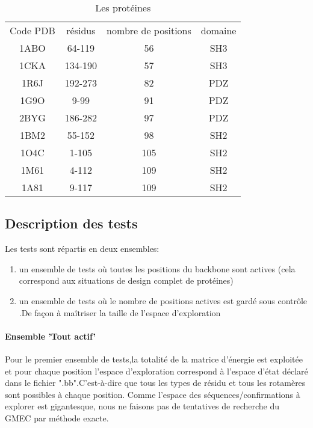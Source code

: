     \begin{table}[!htbp]
      \centering

      \begin{tabular}{cccc}

        \toprule
        Code PDB & résidus & nombre de positions & domaine\\
        \cmidrule{1-4}
        1ABO & 	64-119	 & 	56	 & SH3 \\
        1CKA & 	134-190	 & 	57	 & SH3 \\
        1R6J & 	192-273	 & 	82	 & PDZ \\
        1G9O & 	9-99	 & 	91	 & PDZ \\
        2BYG & 	186-282	 & 	97	 & PDZ \\
        1BM2 & 	55-152	 & 	98	 & SH2 \\
        1O4C & 	1-105	 & 	105	 & SH2 \\
        1M61 & 	4-112	 & 	109	 & SH2 \\
        1A81 & 	9-117	 & 	109	 & SH2 \\
        \bottomrule

      \end{tabular}      
      \caption{Les protéines}
\label{tab:protéines}      
    \end{table}

\subsection{Description des tests}
\label{sec:description_tests}
Les tests sont répartis en deux ensembles:
\begin{enumerate}
\item un ensemble de tests où toutes les positions du backbone sont actives (cela correspond aux situations de design complet de protéines) 
\item un ensemble de tests où le nombre de positions actives est gardé sous contrôle .De façon à maîtriser la taille de l'espace d'exploration
\end{enumerate}


\paragraph{Ensemble 'Tout actif'}
\label{methode_TTactif}
Pour le premier ensemble de tests,la totalité de la matrice d'énergie est exploitée et pour chaque position l'espace d'exploration correspond à l'espace d'état déclaré dans le fichier ".bb".C'est-à-dire que tous les types de résidu et tous les rotamères sont possibles à chaque position.
Comme l'espace des séquences/confirmations à explorer est gigantesque, nous ne faisons pas de tentatives de recherche du GMEC  par méthode exacte. 

